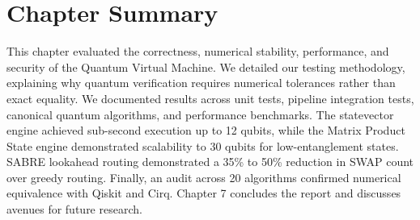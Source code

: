 \section{Chapter Summary}
This chapter evaluated the correctness, numerical stability, performance, and security of the Quantum Virtual Machine. We detailed our testing methodology, explaining why quantum verification requires numerical tolerances rather than exact equality. We documented results across unit tests, pipeline integration tests, canonical quantum algorithms, and performance benchmarks. The statevector engine achieved sub-second execution up to 12 qubits, while the Matrix Product State engine demonstrated scalability to 30 qubits for low-entanglement states. SABRE lookahead routing demonstrated a 35\% to 50\% reduction in SWAP count over greedy routing. Finally, an audit across 20 algorithms confirmed numerical equivalence with Qiskit and Cirq. Chapter 7 concludes the report and discusses avenues for future research.
